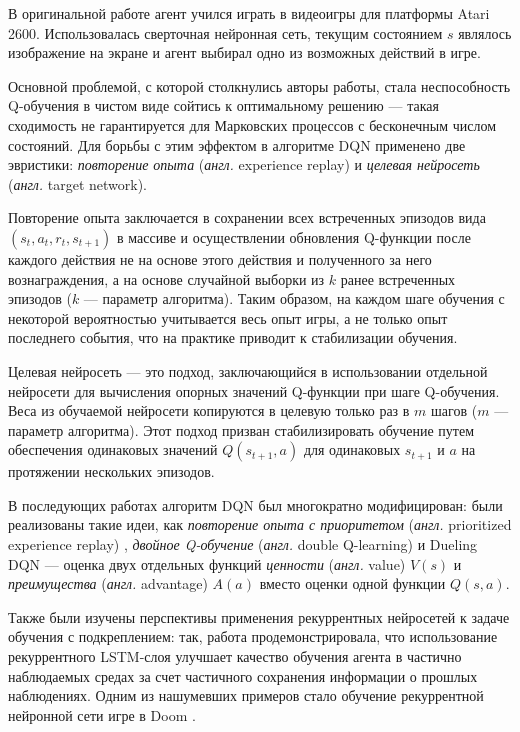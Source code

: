 \documentclass[specification,annotation,times]{itmo-student-thesis}
\theoremstyle{definition}
\begin{document}
В оригинальной работе агент учился играть в видеоигры для платформы Atari 2600.
Использовалась сверточная нейронная сеть, текущим состоянием $s$ являлось
изображение на экране и агент выбирал одно из возможных действий в игре.

Основной проблемой, с которой столкнулись авторы работы, стала неспособность
Q-обучения в чистом виде сойтись к оптимальному решению --- такая сходимость не
гарантируется для Марковских процессов с бесконечным числом состояний. Для борьбы с
этим эффектом в алгоритме DQN применено две эвристики: \textit{повторение опыта}
(\textit{англ.} experience replay) и \textit{целевая нейросеть} (\textit{англ.}
target network).

Повторение опыта заключается в сохранении всех встреченных эпизодов вида
$(s_t, a_t, r_t, s_{t+1})$ в массиве и осуществлении обновления Q-функции после
каждого действия не на основе этого действия и полученного за него
вознаграждения, а на основе случайной выборки из $k$ ранее встреченных эпизодов
($k$ --- параметр алгоритма). Таким образом, на каждом шаге обучения с некоторой
вероятностью учитывается весь опыт игры, а не только опыт последнего события,
что на практике приводит к стабилизации обучения.

Целевая нейросеть --- это подход, заключающийся в использовании отдельной
нейросети для вычисления опорных значений Q-функции при шаге Q-обучения. Веса из
обучаемой нейросети копируются в целевую только раз в $m$ шагов ($m$ ---
параметр алгоритма). Этот подход призван стабилизировать обучение путем
обеспечения одинаковых значений $Q(s_{t+1}, a)$ для одинаковых $s_{t+1}$ и $a$
на протяжении нескольких эпизодов.

В последующих работах алгоритм DQN был многократно модифицирован: были
реализованы такие идеи, как \textit{повторение опыта с приоритетом}
(\textit{англ.} prioritized experience replay) \cite{schaul2015prioritized},
\textit{двойное Q-обучение} (\textit{англ.} double Q-learning)
\cite{van2016deep, hasselt2010double} и Dueling DQN --- оценка двух отдельных
функций \textit{ценности} (\textit{англ.} value) $V(s)$ и \textit{преимущества}
(\textit{англ.} advantage) $A(a)$ вместо оценки одной функции $Q(s, a)$.

Также были изучены перспективы применения рекуррентных нейросетей к задаче
обучения с подкреплением: так, работа \cite{hausknecht2015deep}
продемонстрировала, что использование рекуррентного LSTM-слоя
\cite{hochreiter1997long} улучшает качество обучения агента в частично
наблюдаемых средах за счет частичного сохранения информации о прошлых
наблюдениях. Одним из нашумевших примеров стало обучение рекуррентной нейронной
сети игре в Doom \cite{lample2016playing}.
\end{document}
